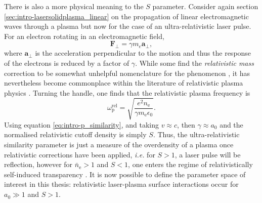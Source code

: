 There is also a more physical meaning to the $S$ parameter. Consider again section \ref{sec:intro-lasersolidplasma_linear} on the propagation of linear electromagnetic waves through a plasma but now for the case of an ultra-relativistic laser pulse. For an electron rotating in an electromagnetic field,
\begin{equation}
	\mathbf{F}_\perp = \gamma m_e \mathbf{a}_\perp,
\end{equation}
where $ \mathbf{a}_\perp$ is the acceleration perpendicular to the motion and thus the response of the electrons is reduced by a factor of $\gamma$. While some find the \textit{relativistic mass} correction to be somewhat unhelpful nomenclature for the phenomenon \cite{steaneRelativityMadeRelatively2012}, it has nevertheless become commonplace within the literature of relativistic plasma physics \cite{umstadterRelativisticLaserPlasma2003}. Turning the handle, one finds that the relativistic plasma frequency is
\begin{equation}
	\omega_\mathrm{p}^\mathrm{rel} = \sqrt{\frac{e^2n_\mathrm{e}}{\gamma m_\mathrm{e} \epsilon_0}}.
\end{equation}
Using equation \ref{eq:intro-p_similarity}, and taking $v \approx c$, then $\gamma \approx a_0$ and the normalised relativistic cutoff density is simply $S$. Thus, the ultra-relativistic similarity parameter is just a measure of the overdensity of a plasma once relativistic corrections have been applied, \textit{i.e.} for $S>1$, a laser pulse will be reflection, however for $\bar{n}_\mathrm{e} > 1$ and $S <1$, one enters the regime of relativistically self-induced transparency \cite{ereminRelativisticSelfInducedTransparency2010}. It is now possible to define the parameter space of interest in this thesis: relativistic laser-plasma surface interactions occur for $a_0 \gg 1$ and $S > 1$.

